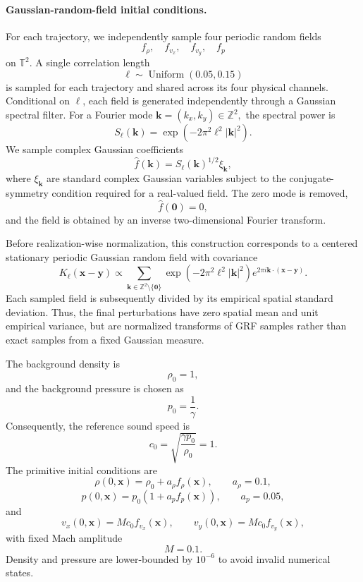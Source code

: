 \documentclass[11pt]{article}
\begin{document}
\paragraph{Gaussian-random-field initial conditions.}
For each trajectory, we independently sample four periodic random fields
\[
    f_\rho,\quad
    f_{v_x},\quad
    f_{v_y},\quad
    f_p
\]
on $\mathbb{T}^2$. A single correlation length
\[
    \ell
    \sim
    \operatorname{Uniform}(0.05,0.15)
\]
is sampled for each trajectory and shared across its four physical channels. Conditional on $\ell$, each field is generated independently through a Gaussian spectral filter. For a Fourier mode $\mathbf{k}=(k_x,k_y)\in\mathbb{Z}^2,$
the spectral power is
\[
    S_\ell(\mathbf{k})
    =
    \exp\left(
        -2\pi^2\ell^2|\mathbf{k}|^2
    \right).
\]
We sample complex Gaussian coefficients
\[
    \widehat f(\mathbf{k})
    =
    S_\ell(\mathbf{k})^{1/2}
    \xi_{\mathbf{k}},
\]
where $\xi_{\mathbf{k}}$ are standard complex Gaussian variables subject to the conjugate-symmetry condition required for a real-valued field. The zero mode is removed,
\[
    \widehat f(\mathbf{0})=0,
\]
and the field is obtained by an inverse two-dimensional Fourier transform.

Before realization-wise normalization, this construction corresponds to a centered stationary periodic Gaussian random field with covariance
\[
    K_\ell(\mathbf{x}-\mathbf{y})
    \propto
    \sum_{\mathbf{k}\in\mathbb{Z}^2\setminus\{\mathbf{0}\}}
    \exp\left(
        -2\pi^2\ell^2|\mathbf{k}|^2
    \right)
    e^{2\pi i\mathbf{k}\cdot(\mathbf{x}-\mathbf{y})}.
\]
Each sampled field is subsequently divided by its empirical spatial standard deviation. Thus, the final perturbations have zero spatial mean and unit empirical variance, but are normalized transforms of GRF samples rather than exact samples from a fixed Gaussian measure.

The background density is
\[
    \rho_0=1,
\]
and the background pressure is chosen as
\[
    p_0=\frac{1}{\gamma}.
\]
Consequently, the reference sound speed is
\[
    c_0
    =
    \sqrt{\frac{\gamma p_0}{\rho_0}}
    =
    1.
\]
The primitive initial conditions are
\[
    \rho(0,\mathbf{x})
    =
    \rho_0
    +
    a_\rho f_\rho(\mathbf{x}),
    \qquad
    a_\rho=0.1,
\]
\[
    p(0,\mathbf{x})
    =
    p_0
    \left(
        1+a_p f_p(\mathbf{x})
    \right),
    \qquad
    a_p=0.05,
\]
and
\[
    v_x(0,\mathbf{x})
    =
    Mc_0 f_{v_x}(\mathbf{x}),
    \qquad
    v_y(0,\mathbf{x})
    =
    Mc_0 f_{v_y}(\mathbf{x}),
\]
with fixed Mach amplitude
\[
    M=0.1.
\]
Density and pressure are lower-bounded by $10^{-6}$ to avoid invalid numerical states.
\end{document}
